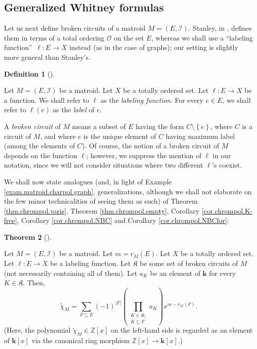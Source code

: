 \documentclass[numbers=enddot,12pt,final,onecolumn,notitlepage]{scrartcl}%
\theoremstyle{definition}
\newtheorem{theo}{Theorem}[section]
\newenvironment{theorem}[1][]
{\begin{theo}[#1]\begin{leftbar}}
{\end{leftbar}\end{theo}}
\newtheorem{defi}[theo]{Definition}
\newenvironment{definition}[1][]
{\begin{defi}[#1]\begin{leftbar}}
{\end{leftbar}\end{defi}}
\let\sumnonlimits\sum
\let\prodnonlimits\prod
\renewcommand{\sum}{\sumnonlimits\limits}
\renewcommand{\prod}{\prodnonlimits\limits}
\begin{document}
\subsection{Generalized Whitney formulas}

Let us next define broken circuits of a matroid $M=\left(  E,\mathcal{I}%
\right)  $. Stanley, in \cite[\S 4.1]{Stanley}, defines them in terms of a
total ordering $\mathcal{O}$ on the set $E$, whereas we shall use a
\textquotedblleft labeling function\textquotedblright\ $\ell:E\rightarrow X$
instead (as in the case of graphs); our setting is slightly more general than Stanley's.

\begin{definition}
\label{def.matroid.BC}Let $M=\left(  E,\mathcal{I}\right)  $ be a matroid. Let
$X$ be a totally ordered set. Let $\ell:E\rightarrow X$ be a function. We
shall refer to $\ell$ as the \emph{labeling function}. For every $e\in E$, we
shall refer to $\ell\left(  e\right)  $ as the \emph{label} of $e$.

A \emph{broken circuit} of $M$ means a subset of $E$ having the form
$C\setminus\left\{  e\right\}  $, where $C$ is a circuit of $M$, and where $e$
is the unique element of $C$ having maximum label (among the elements of $C$).
Of course, the notion of a broken circuit of $M$ depends on the function
$\ell$; however, we suppress the mention of $\ell$ in our notation, since we
will not consider situations where two different $\ell$'s coexist.
\end{definition}

We shall now state analogues (and, in light of Example
\ref{exam.matroid.charpol.graph}, generalizations, although we shall not
elaborate on the few minor technicalities of seeing them as such) of Theorem
\ref{thm.chrompol.varis}, Theorem \ref{thm.chrompol.empty}, Corollary
\ref{cor.chrompol.K-free}, Corollary \ref{cor.chrompol.NBC} and Corollary
\ref{cor.chrompol.NBCfor}:

\begin{theorem}
\label{thm.matroid.charpol.varis}Let $M=\left(  E,\mathcal{I}\right)  $ be a
matroid. Let $m=r_{M}\left(  E\right)  $. Let $X$ be a totally ordered set.
Let $\ell:E\rightarrow X$ be a labeling function. Let $\mathfrak{K}$ be some
set of broken circuits of $M$ (not necessarily containing all of them). Let
$a_{K}$ be an element of $\mathbf{k}$ for every $K\in\mathfrak{K}$. Then,%
\[
\widetilde{\chi}_{M}=\sum_{F\subseteq E}\left(  -1\right)  ^{\left\vert
F\right\vert }\left(  \prod_{\substack{K\in\mathfrak{K};\\K\subseteq F}%
}a_{K}\right)  x^{m-r_{M}\left(  F\right)  }.
\]
(Here, the polynomial $\widetilde{\chi}_{M}
\in\mathbb{Z}\left[  x\right]  $ on the left-hand side is regarded as an
element of $\mathbf{k}\left[  x\right]  $ via the canonical ring morphism
$\mathbb{Z}\left[  x\right]  \rightarrow\mathbf{k}\left[  x\right]  $.)
\end{theorem}
\end{document}
